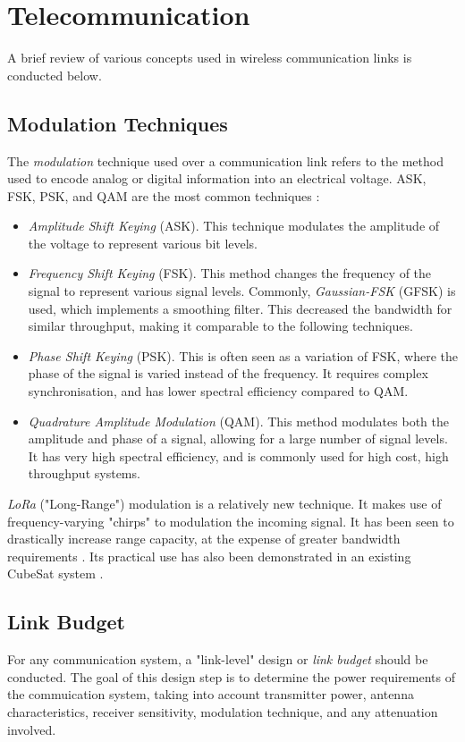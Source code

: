 \section{Telecommunication}\label{sec:telecommunication_theory}
A brief review of various concepts used in wireless communication links is conducted below.

\subsection{Modulation Techniques}
The \textit{modulation} technique used over a communication link refers to the method used to encode analog or digital information into an electrical voltage. ASK, FSK, PSK, and QAM are the most common techniques \cite{site-satelliteModulationOverview} \cite{site-satelliteModulationComparison}:
\begin{itemize}
    \item \textit{Amplitude Shift Keying} (ASK). This technique modulates the amplitude of the voltage to represent various bit levels.
    \item \textit{Frequency Shift Keying} (FSK). This method changes the frequency of the signal to represent various signal levels. Commonly, \textit{Gaussian-FSK} (GFSK) is used, which implements a smoothing filter. This decreased the bandwidth for similar throughput, making it comparable to the following techniques.
    \item \textit{Phase Shift Keying} (PSK). This is often seen as a variation of FSK, where the phase of the signal is varied instead of the frequency. It requires complex synchronisation, and has lower spectral efficiency compared to QAM.
    \item \textit{Quadrature Amplitude Modulation} (QAM). This method modulates both the amplitude and phase of a signal, allowing for a large number of signal levels. It has very high spectral efficiency, and is commonly used for high cost, high throughput systems.
\end{itemize}

\textit{LoRa} ("Long-Range") modulation is a relatively new technique. It makes use of frequency-varying "chirps" to modulation the incoming signal. It has been seen to drastically increase range capacity, at the expense of greater bandwidth requirements \cite{datasheet-SX1278}. Its practical use has also been demonstrated in an existing CubeSat system \cite{design-FOSSASATLink}.

\newpage
\subsection{Link Budget}\label{sec:link_budget}
For any communication system, a "link-level" design or \textit{link budget} should be conducted. The goal of this design step is to determine the power requirements of the commuication system, taking into account transmitter power, antenna characteristics, receiver sensitivity, modulation technique, and any attenuation involved.

